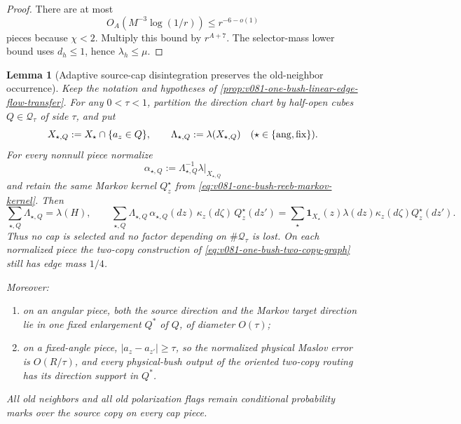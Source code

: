 \documentclass[10pt]{article}
\newtheorem{lemma}[theorem]{Lemma}
\begin{document}
\begin{proof}
There are at most
\[
O_A\!\left(M^{-3}\log(1/r)\right)
\le
r^{-6-o(1)}
\]
pieces because \(\chi<2\).  Multiply this bound by \(r^{A+7}\).  The selector-mass lower bound
uses \(d_h\le1\), hence \(\lambda_h\le\mu\).
\end{proof}

\begin{lemma}[Adaptive source-cap disintegration preserves the old-neighbor occurrence]
\label{lem:v081-adaptive-source-cap-occurrence}
Keep the notation and hypotheses of
\cref{prop:v081-one-bush-linear-edge-flow-transfer}.  For any
\(0<\tau<1\), partition the direction chart by half-open cubes
\(Q\in\mathcal Q_\tau\) of side \(\tau\), and put
\[
X_{\star,Q}:=X_\star\cap\{a_z\in Q\},
\qquad
\Lambda_{\star,Q}:=\lambda(X_{\star,Q})
\quad
(\star\in\{{\rm ang},{\rm fix}\}).
\]
For every nonnull piece normalize
\[
\alpha_{\star,Q}:=\Lambda_{\star,Q}^{-1}\lambda|_{X_{\star,Q}}
\]
and retain the same Markov kernel \(Q_z^\star\) from
\eqref{eq:v081-one-bush-reeb-markov-kernel}.  Then
\begin{equation}
\label{eq:v081-adaptive-source-cap-mass}
\boxed{
\sum_{\star,Q}\Lambda_{\star,Q}=\lambda(H),
\qquad
\sum_{\star,Q}
\Lambda_{\star,Q}\,
\alpha_{\star,Q}(dz)\,\kappa_z(d\zeta)\,Q_z^\star(dz')
=
\sum_\star
\mathbf1_{X_\star}(z)\lambda(dz)\kappa_z(d\zeta)Q_z^\star(dz').
}
\end{equation}
Thus no cap is selected and no factor depending on
\(\#\mathcal Q_\tau\) is lost.  On each normalized piece the two-copy construction of
\eqref{eq:v081-one-bush-two-copy-graph} still has edge mass \(1/4\).

Moreover:
\begin{enumerate}[label=\textnormal{(\roman*)}]
\item on an angular piece, both the source direction and the Markov target direction lie in one
fixed enlargement \(Q^*\) of \(Q\), of diameter \(O(\tau)\);
\item on a fixed-angle piece, \(|a_z-a_{z'}|\ge\tau\), so the normalized physical Maslov error is
\(O(R/\tau)\), and every physical-bush output of the oriented two-copy routing has its direction
support in \(Q^*\).
\end{enumerate}
All old neighbors and all old polarization flags remain conditional probability marks over the
source copy on every cap piece.
\end{lemma}
\end{document}
